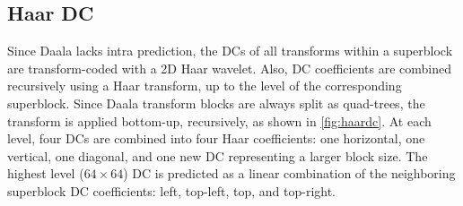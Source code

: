 \documentclass[english,conference,10pt]{IEEEtran}
\begin{document}
\subsection{Haar DC}

Since Daala lacks intra prediction, the DCs of all transforms within a superblock
are transform-coded with a 2D Haar wavelet.
Also, DC coefficients are combined recursively using a Haar transform,
up to the level of the corresponding superblock. Since Daala transform blocks
are always split as quad-trees, the transform is applied bottom-up, recursively,
as shown in \cref{fig:haardc}.
At each level, four DCs are combined into four Haar coefficients: one horizontal,
one vertical, one diagonal, and one new DC representing a larger block size.
The highest level ($64\times 64$) DC is predicted as a linear combination of the 
neighboring superblock DC coefficients: left, top-left, top, and top-right.
\end{document}
